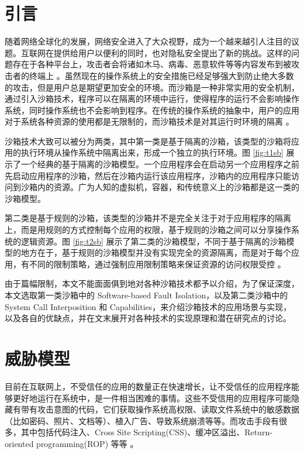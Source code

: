\documentclass[final,5p,times]{elsarticle}
\begin{document}


\section{引言}
\label{s:introduction}

随着网络全球化的发展，网络安全进入了大众视野，成为一个越来越引人注目的议题。互联网在提供给用户以便利的同时，也对隐私安全提出了新的挑战。这样的问题存在于各种平台上，攻击者会将诸如木马、病毒、恶意软件等等内容发布到被攻击者的终端上 \cite{miwa}。虽然现在的操作系统上的安全措施已经足够强大到防止绝大多数的攻击，但是用户总是期望更加安全的环境。而沙箱是一种非常实用的安全机制，通过引入沙箱技术，程序可以在隔离的环境中运行，使得程序的运行不会影响操作系统，同时操作系统也不会影响到程序。在传统的操作系统的抽象中，用户的应用对于系统各种资源的使用都是无限制的，而沙箱技术是对其运行时环境的隔离 \cite{sandbox}。


沙箱技术大致可以被分为两类，其中第一类是基于隔离的沙箱，该类型的沙箱将应用的执行环境从操作系统中隔离出来，形成一个独立的执行环境。图 \ref{fig:t1sb} 展示了一个经典的基于隔离的沙箱模型。一个应用程序会在启动另一个应用程序之前先启动应用程序的沙箱，然后在沙箱内运行该应用程序，沙箱内的应用程序只能访问到沙箱内的资源。广为人知的虚拟机，容器，和传统意义上的沙箱都是这一类的沙箱模型。

第二类是基于规则的沙箱，该类型的沙箱并不是完全关注于对于应用程序的隔离上，而是用规则的方式控制每个应用的权限，基于规则的沙箱之间可以分享操作系统的逻辑资源。图 \ref{fig:t2sb} 展示了第二类的沙箱模型，不同于基于隔离的沙箱模型的地方在于，基于规则的沙箱模型并没有实现完全的资源隔离，而是对于每个应用，有不同的限制策略，通过强制应用限制策略来保证资源的访问权限受控 \cite{schreuders}。

由于篇幅限制，本文不能面面俱到地对各种沙箱技术都予以介绍，为了保证深度，本文选取第一类沙箱中的 Software-based Fault Isolation，以及第二类沙箱中的 System Call Interposition 和 Capabilities，来介绍沙箱技术的应用场景与实现，以及各自的优缺点，并在文末展开对各种技术的实现原理和潜在研究点的讨论。

\section{威胁模型}
\label{s:threat_model}

目前在互联网上，不受信任的应用的数量正在快速增长，让不受信任的应用程序能够更好地运行在系统中，是一件相当困难的事情。这些不受信用的应用程序可能隐藏有带有攻击意图的代码，它们获取操作系统高权限、读取文件系统中的敏感数据（比如密码、照片、文档等）、植入广告、导致系统崩溃等等。而攻击手段有很多，其中包括代码注入、Cross Site Scripting(CSS)、缓冲区溢出、Return-oriented programming(ROP) 等等 \cite{miwa}。	
\end{document}
